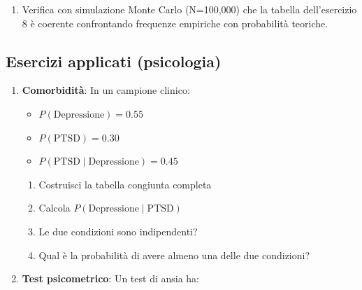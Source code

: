 \documentclass[
  letterpaper,
  DIV=11,
  numbers=noendperiod,
  oneside]{scrreprt}
\providecommand{\tightlist}{%
  \setlength{\itemsep}{0pt}\setlength{\parskip}{0pt}}
\theoremstyle{definition}
\theoremstyle{plain}
\theoremstyle{definition}
\theoremstyle{remark}
\begin{document}
\begin{tcolorbox}
\begin{enumerate}
  \begin{itemize}
  \tightlist
  \item
    Test COVID: \(P(+) = 0.08\)
  \item
    Malattia: \(P(\text{COVID}) = 0.05\)
  \item
    Sensibilità: \(P(+ \mid \text{COVID}) = 0.90\)
  \end{itemize}

  Calcola poi:

  \begin{enumerate}
  \def\labelenumii{\alph{enumii}.}
  \tightlist
  \item
    \(P(\text{COVID} \mid +)\) (valore predittivo positivo)
  \item
    \(P(\text{COVID} \mid -)\) (probabilità dopo test negativo)
  \item
    Specificità del test
  \end{enumerate}
\item
  Verifica con simulazione Monte Carlo (N=100,000) che la tabella
  dell'esercizio 8 è coerente confrontando frequenze empiriche con
  probabilità teoriche.
\end{enumerate}

\subsection{Esercizi applicati
(psicologia)}\label{esercizi-applicati-psicologia}

\begin{enumerate}
\def\labelenumi{\arabic{enumi}.}
\setcounter{enumi}{9}
\item
  \textbf{Comorbidità}: In un campione clinico:

  \begin{itemize}
  \tightlist
  \item
    \(P(\text{Depressione}) = 0.55\)
  \item
    \(P(\text{PTSD}) = 0.30\)
  \item
    \(P(\text{PTSD} \mid \text{Depressione}) = 0.45\)
  \end{itemize}

  \begin{enumerate}
  \def\labelenumii{\alph{enumii}.}
  \tightlist
  \item
    Costruisci la tabella congiunta completa
  \item
    Calcola \(P(\text{Depressione} \mid \text{PTSD})\)
  \item
    Le due condizioni sono indipendenti?
  \item
    Qual è la probabilità di avere almeno una delle due condizioni?
  \end{enumerate}
\item
  \textbf{Test psicometrico}: Un test di ansia ha:


\end{enumerate}
\end{tcolorbox}
\end{document}
